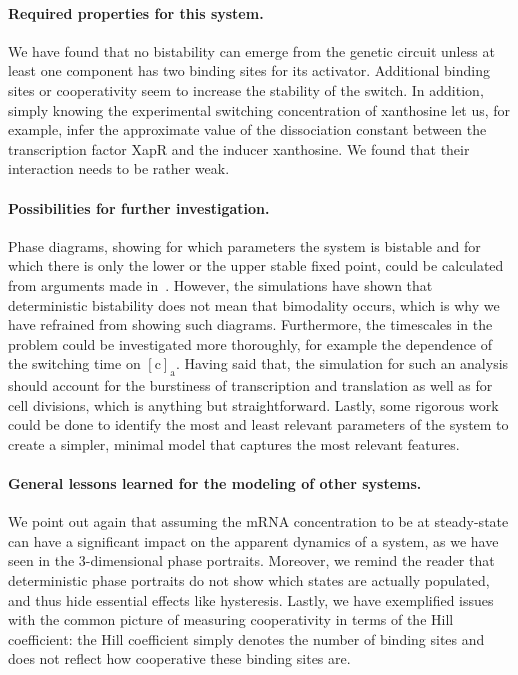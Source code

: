 \documentclass[10pt,letterpaper]{article}
\newcommand{\n}[1]{\mathrm{#1}}
\begin{document}
\paragraph*{Required properties for this system.}
We have found that no bistability can emerge from the genetic circuit unless
at least one component has two binding sites for its activator. Additional
binding sites or cooperativity seem to increase the stability of the switch.
In addition, simply knowing the experimental switching concentration of
xanthosine let us, for example, infer the approximate value of the
dissociation constant between the transcription factor XapR and the inducer
xanthosine. We found that their interaction needs to be rather weak.

\paragraph*{Possibilities for further investigation.}
Phase diagrams, showing for which parameters the system is bistable and for
which there is only the lower or the upper stable fixed point, could be
calculated from arguments made in~\cite{Cherry2000}. However, the
simulations have shown that deterministic bistability does not mean that
bimodality occurs, which is why we have refrained from showing such
diagrams. Furthermore, the timescales in the problem could be investigated
more thoroughly, for example the dependence of the switching time on
$\n{[c]_a}$. Having said that, the simulation for such an analysis should
account for the burstiness of transcription and translation as well as for
cell divisions, which is anything but straightforward. Lastly, some rigorous
work could be done to identify the most and least relevant parameters of the
system to create a simpler, minimal model that captures the most relevant
features.

\paragraph*{General lessons learned for the modeling of other systems.}
We point out again that assuming the mRNA concentration to be at
steady-state can have a significant impact on the apparent dynamics of a
system, as we have seen in the 3-dimensional phase portraits. Moreover, we
remind the reader that deterministic phase portraits do not show which
states are actually populated, and thus hide essential effects like
hysteresis. Lastly, we have exemplified issues with the common picture of
measuring cooperativity in terms of the Hill coefficient: the Hill
coefficient simply denotes the number of binding sites and does not reflect
how cooperative these binding sites are. 
\end{document}
